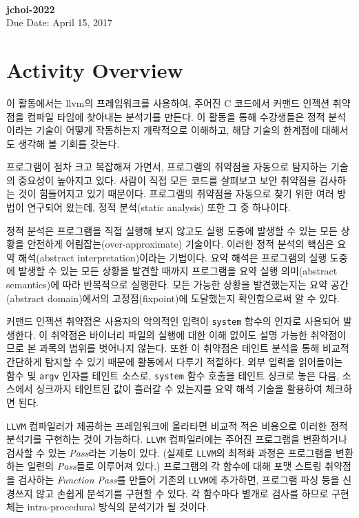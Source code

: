 \documentclass[a4paper, 11pt]{article}
\theoremstyle{definition}
\begin{document}
 \\
         {\phantom{} \hfill \textbf{jchoi-2022}} \\
         {\phantom{} \hfill Due Date: April 15, 2017} \\

\section{Activity Overview}
이 활동에서는 llvm의 프레임워크를 사용하여, 주어진 C 코드에서 커맨드 인젝션
취약점을 컴파일 타임에 찾아내는 분석기를 만든다. 이 활동을 통해 수강생들은 정적
분석이라는 기술이 어떻게 작동하는지 개략적으로 이해하고, 해당 기술의 한계점에
대해서도 생각해 볼 기회를 갖는다.

프로그램이 점차 크고 복잡해져 가면서, 프로그램의 취약점을 자동으로 탐지하는
기술의 중요성이 높아지고 있다. 사람이 직접 모든 코드를 살펴보고 보안 취약점을
검사하는 것이 힘들어지고 있기 때문이다. 프로그램의 취약점을 자동으로 찾기 위한
여러 방법이 연구되어 왔는데, 정적 분석(static analysis) 또한 그 중 하나이다.

정적 분석은 프로그램을 직접 실행해 보지 않고도 실행 도중에 발생할 수 있는 모든
상황을 안전하게 어림잡는(over-approximate) 기술이다. 이러한 정적 분석의 핵심은
요약 해석(abstract interpretation)이라는 기법이다\cite{abstract, framework}.
요약 해석은 프로그램의 실행 도중에 발생할 수 있는 모든 상황을 발견할 때까지
프로그램을 요약 실행 의미(abstract semantics)에 따라 반복적으로 실행한다. 모든
가능한 상황을 발견했는지는 요약 공간(abstract domain)에서의 고정점(fixpoint)에
도달했는지 확인함으로써 알 수 있다\cite{PALecture}.

커맨드 인젝션 취약점은 사용자의 악의적인 입력이 \texttt{system} 함수의 인자로
사용되어 발생한다. 이 취약점은 바이너리 파일의 실행에 대한 이해 없이도 설명
가능한 취약점이므로 본 과목의 범위를 벗어나지 않는다. 또한 이 취약점은 테인트
분석을 통해 비교적 간단하게 탐지할 수 있기 때문에 활동에서 다루기 적절하다. 외부
입력을 읽어들이는 함수 및 \texttt{argv} 인자를 테인트 소스로, \texttt{system}
함수 호출을 테인트 싱크로 놓은 다음, 소스에서 싱크까지 테인트된 값이 흘러갈 수
있는지를 요약 해석 기술을 활용하여 체크하면 된다.

\texttt{LLVM} 컴파일러가 제공하는 프레임워크에 올라타면 비교적 적은 비용으로
이러한 정적 분석기를 구현하는 것이 가능하다. \texttt{LLVM} 컴파일러에는 주어진
프로그램을 변환하거나 검사할 수 있는 \emph{Pass}라는 기능이 있다\cite{LLVMPass}.
(실제로 \texttt{LLVM}의 최적화 과정은 프로그램을 변환하는 일련의 \emph{Pass}들로
이루어져 있다.) 프로그램의 각 함수에 대해 포맷 스트링 취약점을 검사하는
\emph{Function Pass}를 만들어 기존의 \texttt{LLVM}에 추가하면, 프로그램 파싱
등을 신경쓰지 않고 손쉽게 분석기를 구현할 수 있다. 각 함수마다 별개로 검사를
하므로 구현체는 intra-procedural 방식의 분석기가 될 것이다.
\end{document}
